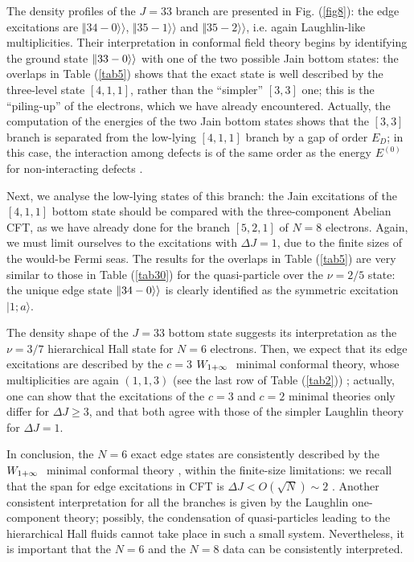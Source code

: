 The density profiles of the $J=33$ branch
are presented in Fig. (\ref{fig8}):
the edge excitations are $\Vert 34-0\rangle\rangle$, 
$\Vert 35-1\rangle\rangle$ and $\Vert 35-2\rangle\rangle$, i.e.
again Laughlin-like multiplicities.
Their interpretation in conformal field theory begins by 
identifying the ground state 
$\Vert 33-0\rangle\rangle$ with one of the two possible Jain bottom states:
the overlaps in Table (\ref{tab5}) shows that the exact state is 
well described by the three-level state $[4,1,1]$, rather than the
``simpler'' $[3,3]$ one; this is the ``piling-up'' of the 
electrons, which we have already encountered.
Actually, the computation of the energies of the two Jain bottom states
shows that the $[3,3]$ branch is separated from the low-lying 
$[4,1,1]$ branch by a gap of order $E_D$; in this case, the interaction 
among defects is of the same order as the energy $E^{(0)}$ 
for non-interacting defects \cite{jain}.

Next, we analyse the low-lying states of this branch: the Jain
excitations of the $[4,1,1]$ bottom state should be compared with
the three-component Abelian CFT, as we have already done for the
branch $[5,2,1]$ of $N=8$ electrons.
Again, we must limit ourselves to the excitations with $\Delta J=1$,
due to the finite sizes of the would-be Fermi seas.
The results for the overlaps in Table (\ref{tab5}) are very
similar to those in Table (\ref{tab30}) for the quasi-particle
over the $\nu=2/5$ state: the unique edge state $\Vert 34-0 \rangle\rangle$ 
is clearly identified as the symmetric excitation $\vert 1; a\rangle$. 

The  density shape of the $J=33$ bottom state suggests
its interpretation as the $\nu=3/7$ hierarchical Hall state for $N=6$
electrons. Then, we expect that its edge excitations are described by 
the $c=3$ $W_{1+\infty}\ $ minimal conformal theory, whose multiplicities 
are again $(1,1,3)$ (see the last row of Table (\ref{tab2})) \cite{ctz5};
actually, one can show that the excitations of the $c=3$ and 
$c=2$ minimal theories only differ for $\Delta J \ge 3$, and that 
both agree with those of the simpler Laughlin theory for $\Delta J=1$.

In conclusion, the $N=6$ exact edge states are consistently described
by the $W_{1+\infty}\ $ minimal conformal theory \cite{ctz5},
within the finite-size limitations: 
we recall that the span for edge excitations in CFT is 
$\Delta J < O(\sqrt{N}) \sim 2$ \cite{cdtz1}.
Another consistent interpretation for all the branches is 
given by the Laughlin one-component theory;
possibly, the condensation of 
quasi-particles leading to the hierarchical Hall fluids
cannot take place in such a small system.
Nevertheless, it is important that the $N=6$ and the $N=8$ data
can be consistently interpreted.

